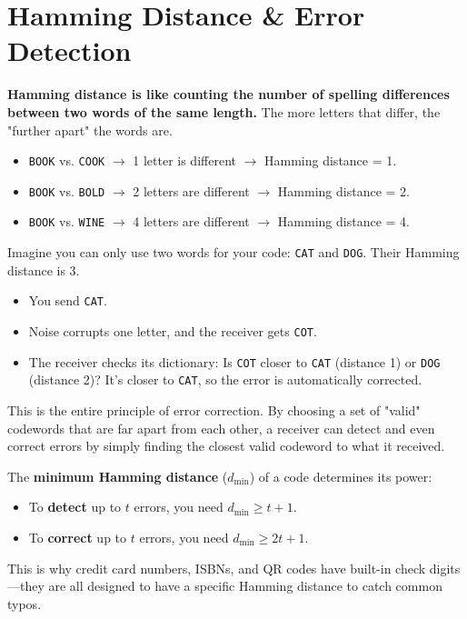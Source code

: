 
\chapter{Hamming Distance \& Error Detection}
\label{ch:hamming-distance}

\begin{nontechnical}
    \textbf{Hamming distance is like counting the number of spelling differences between two words of the same length.} The more letters that differ, the "further apart" the words are.
    
    \begin{itemize}
        \item \texttt{BOOK} vs. \texttt{COOK} $\rightarrow$ 1 letter is different $\rightarrow$ Hamming distance = 1.
        \item \texttt{BOOK} vs. \texttt{BOLD} $\rightarrow$ 2 letters are different $\rightarrow$ Hamming distance = 2.
        \item \texttt{BOOK} vs. \texttt{WINE} $\rightarrow$ 4 letters are different $\rightarrow$ Hamming distance = 4.
    \end{itemize}

    Imagine you can only use two words for your code: \texttt{CAT} and \texttt{DOG}. Their Hamming distance is 3.
    \begin{itemize}
        \item You send \texttt{CAT}.
        \item Noise corrupts one letter, and the receiver gets \texttt{COT}.
        \item The receiver checks its dictionary: Is \texttt{COT} closer to \texttt{CAT} (distance 1) or \texttt{DOG} (distance 2)? It's closer to \texttt{CAT}, so the error is automatically corrected.
    \end{itemize}
    This is the entire principle of error correction. By choosing a set of "valid" codewords that are far apart from each other, a receiver can detect and even correct errors by simply finding the closest valid codeword to what it received.

    The \textbf{minimum Hamming distance} ($d_{\min}$) of a code determines its power:
    \begin{itemize}
        \item To \textbf{detect} up to $t$ errors, you need $d_{\min} \ge t+1$.
        \item To \textbf{correct} up to $t$ errors, you need $d_{\min} \ge 2t+1$.
    \end{itemize}
    This is why credit card numbers, ISBNs, and QR codes have built-in check digits---they are all designed to have a specific Hamming distance to catch common typos.
\end{nontechnical}


